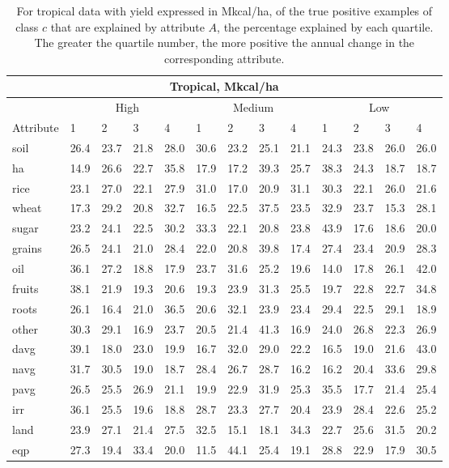\documentclass[12pt,twoside]{article}
\begin{document}
\begin{table}
\centering
\begin{tabular}{lllllllllllll}
\toprule
\multicolumn{13}{c}{\textbf{Tropical, Mkcal/ha}} \\
\midrule
& \multicolumn{4}{c}{High} & \multicolumn{4}{c}{Medium} & \multicolumn{4}{c}{Low} \\
\cmidrule(lr){2-5}
\cmidrule(lr){6-9}
\cmidrule(l){10-13}
Attribute & 1 & 2 & 3 & 4 & 1 & 2 & 3 & 4 & 1 & 2 & 3 & 4 \\
\midrule
soil & 26.4 & 23.7 & 21.8 & 28.0 & 30.6 & 23.2 & 25.1 & 21.1 & 24.3 & 23.8 & 26.0 & 26.0 \\
ha& 14.9 & 26.6 & 22.7 & 35.8 & 17.9 & 17.2 & 39.3 & 25.7 & 38.3 & 24.3 & 18.7 & 18.7 \\
rice & 23.1 & 27.0 & 22.1 & 27.9 & 31.0 & 17.0 & 20.9 & 31.1 & 30.3 & 22.1 & 26.0 & 21.6 \\
wheat & 17.3 & 29.2 & 20.8 & 32.7 & 16.5 & 22.5 & 37.5 & 23.5 & 32.9 & 23.7 & 15.3 & 28.1 \\
sugar & 23.2 & 24.1 & 22.5 & 30.2 & 33.3 & 22.1 & 20.8 & 23.8 & 43.9 & 17.6 & 18.6 & 20.0 \\
grains & 26.5 & 24.1 & 21.0 & 28.4 & 22.0 & 20.8 & 39.8 & 17.4 & 27.4 & 23.4 & 20.9 & 28.3 \\
oil & 36.1 & 27.2 & 18.8 & 17.9 & 23.7 & 31.6 & 25.2 & 19.6 & 14.0 & 17.8 & 26.1 & 42.0 \\
fruits & 38.1 & 21.9 & 19.3 & 20.6 & 19.3 & 23.9 & 31.3 & 25.5 & 19.7 & 22.8 & 22.7 & 34.8 \\
roots & 26.1 & 16.4 & 21.0 & 36.5 & 20.6 & 32.1 & 23.9 & 23.4 & 29.4 & 22.5 & 29.1 & 18.9 \\
other & 30.3 & 29.1 & 16.9 & 23.7 & 20.5 & 21.4 & 41.3 & 16.9 & 24.0 & 26.8 & 22.3 & 26.9 \\
davg & 39.1 & 18.0 & 23.0 & 19.9 & 16.7 & 32.0 & 29.0 & 22.2 & 16.5 & 19.0 & 21.6 & 43.0 \\
navg & 31.7 & 30.5 & 19.0 & 18.7 & 28.4 & 26.7 & 28.7 & 16.2 & 16.2 & 20.4 & 33.6 & 29.8 \\
pavg & 26.5 & 25.5 & 26.9 & 21.1 & 19.9 & 22.9 & 31.9 & 25.3 & 35.5 & 17.7 & 21.4 & 25.4 \\
irr & 36.1 & 25.5 & 19.6 & 18.8 & 28.7 & 23.3 & 27.7 & 20.4 & 23.9 & 28.4 & 22.6 & 25.2 \\
land & 23.9 & 27.1 & 21.4 & 27.5 & 32.5 & 15.1 & 18.1 & 34.3 & 22.7 & 25.6 & 31.5 & 20.2 \\
eqp & 27.3 & 19.4 & 33.4 & 20.0 & 11.5 & 44.1 & 25.4 & 19.1 & 28.8 & 22.9 & 17.9 & 30.5 \\
\bottomrule
\end{tabular}
\captionsetup{width=.7\textwidth}
\caption[Percentage of Examples Explained by Quartile (Tropical, Mkcal/ha)]{For tropical data with yield expressed in Mkcal/ha, of the true positive examples of class $c$ that are explained by attribute $A$, the percentage explained by each quartile. The greater the quartile number, the more positive the annual change in the corresponding attribute.}
\label{k.ny.trop.quartiles}
\end{table}
\end{document}

